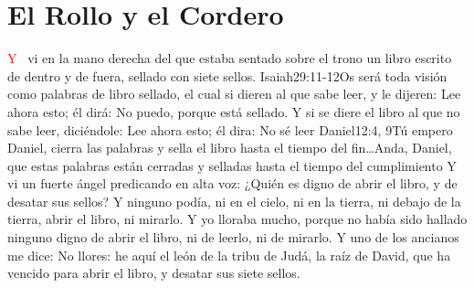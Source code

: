 \chapter{El Rollo y el Cordero}
\lettrine[lines=3]{\textcolor{red}{Y}}{\ } vi en la mano derecha del que estaba sentado sobre el trono un libro escrito de dentro y de fuera, sellado con siete sellos.%
 					{Isaiah}{29:11-12}{Os será toda visión como palabras de libro sellado, el cual si dieren al que sabe leer, y le dijeren: Lee ahora esto; él dirá: No puedo, porque está sellado. Y si se diere el libro al que no sabe leer, diciéndole: Lee ahora esto; él dira: No sé leer}%
 					{Daniel}{12:4, 9}{Tú empero Daniel, cierra las palabras y sella el libro hasta el tiempo del fin\ldots Anda, Daniel, que estas palabras están cerradas y selladas hasta el tiempo del cumplimiento} %
Y vi un fuerte ángel predicando en alta voz: ¿Quién es digno de abrir el libro, y de desatar sus sellos? %
Y ninguno podía, ni en el cielo, ni en la tierra, ni debajo de la tierra, abrir el libro, ni mirarlo. %
Y yo lloraba mucho, porque no había sido hallado ninguno digno de abrir el libro, ni de leerlo, ni de mirarlo. %
Y uno de los ancianos me dice: No llores: he aquí el león de la tribu de Judá,%
 la raíz de David,%
 que ha vencido para abrir el libro, y desatar sus siete sellos. 
 
